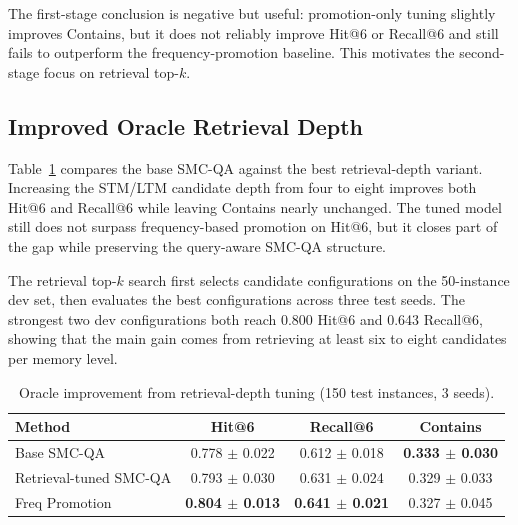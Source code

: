 \documentclass{article}
\begin{document}
The first-stage conclusion is negative but useful: promotion-only tuning slightly improves Contains, but it does not reliably improve Hit@6 or Recall@6 and still fails to outperform the frequency-promotion baseline. This motivates the second-stage focus on retrieval top-$k$.

\subsection{Improved Oracle Retrieval Depth}

Table~\ref{tab:retrieval-tuned} compares the base SMC-QA against the best retrieval-depth variant. Increasing the STM/LTM candidate depth from four to eight improves both Hit@6 and Recall@6 while leaving Contains nearly unchanged. The tuned model still does not surpass frequency-based promotion on Hit@6, but it closes part of the gap while preserving the query-aware SMC-QA structure.

The retrieval top-$k$ search first selects candidate configurations on the 50-instance dev set, then evaluates the best configurations across three test seeds. The strongest two dev configurations both reach 0.800 Hit@6 and 0.643 Recall@6, showing that the main gain comes from retrieving at least six to eight candidates per memory level.

\begin{table}[h]
\centering
\caption{Retrieval top-$k$ tuning details from the improvement run log.}
\label{tab:retrieval-search}
\end{table}

\begin{table}[h]
\centering
\caption{Oracle improvement from retrieval-depth tuning (150 test instances, 3 seeds).}
\label{tab:retrieval-tuned}
\begin{tabular}{lccc}
\toprule
\textbf{Method} & \textbf{Hit@6} & \textbf{Recall@6} & \textbf{Contains} \\
\midrule
Base SMC-QA & 0.778 $\pm$ 0.022 & 0.612 $\pm$ 0.018 & \textbf{0.333 $\pm$ 0.030} \\
Retrieval-tuned SMC-QA & 0.793 $\pm$ 0.030 & 0.631 $\pm$ 0.024 & 0.329 $\pm$ 0.033 \\
Freq Promotion & \textbf{0.804 $\pm$ 0.013} & \textbf{0.641 $\pm$ 0.021} & 0.327 $\pm$ 0.045 \\
\bottomrule
\end{tabular}
\end{table}
\end{document}
